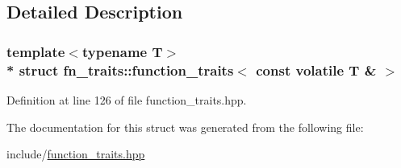 \subsection{Detailed Description}
\subsubsection*{template$<$typename T$>$\\*
struct fn\+\_\+traits\+::function\+\_\+traits$<$ const volatile T \& $>$}



Definition at line 126 of file function\+\_\+traits.\+hpp.



The documentation for this struct was generated from the following file\+:\begin{DoxyCompactItemize}
\item 
include/\hyperlink{function__traits_8hpp}{function\+\_\+traits.\+hpp}\end{DoxyCompactItemize}
